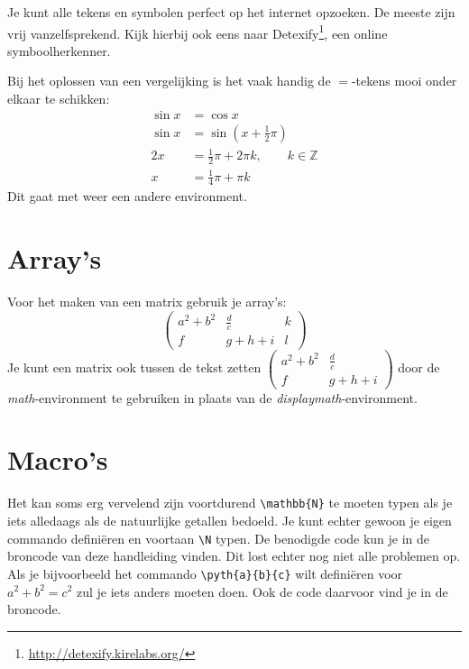 Je kunt alle tekens en symbolen perfect op het internet opzoeken. De meeste zijn
vrij vanzelfsprekend. Kijk hierbij ook eens naar
Detexify\footnote{\url{http://detexify.kirelabs.org/}}, een online
symboolherkenner.

Bij het oplossen van een vergelijking is het vaak handig de $=$-tekens mooi
onder elkaar te schikken:
\begin{align*}
	\sin x	& = \cos x \\
	\sin x	& = \sin(x + \tfrac{1}{2}\pi) \\
	2x		& = \tfrac{1}{2}\pi + 2\pi k, \hspace{2em} k \in \mathbb{Z} \\
	x		& = \tfrac{1}{4}\pi + \pi k
\end{align*}
Dit gaat met weer een andere environment.


\section{Array's}

Voor het maken van een matrix gebruik je array's:
\[
	\left(\begin{array}{ccc}
		a^2 + b^2  &  \tfrac{d}{c}  &  k \\
		f          &  g + h + i     &  l
	\end{array}\right)
\]
Je kunt een matrix ook tussen de tekst zetten
\(\left(\begin{array}{cc}
	a^2 + b^2  &  \tfrac{d}{c} \\
	f          &  g + h + i
\end{array}\right)\)
door de \emph{math}-environment te gebruiken in plaats van de
\emph{displaymath}-environment.


\section{Macro's}
Het kan soms erg vervelend zijn voortdurend \verb.\mathbb{N}. te moeten typen
als je iets alledaags als de natuurlijke getallen bedoeld. Je kunt echter gewoon
je eigen commando defini\"eren en voortaan \verb.\N. typen. De benodigde code
kun je in de broncode van deze handleiding vinden. Dit lost echter nog niet alle
problemen op. Als je bijvoorbeeld het commando \verb|\pyth{a}{b}{c}| wilt
defini\"eren voor \(a^2 + b^2 = c^2\) zul je iets anders moeten doen. Ook de
code daarvoor vind je in de broncode.



